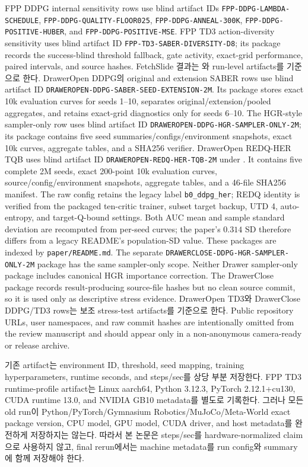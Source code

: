\documentclass[letterpaper]{article}
\begin{document}
FPP DDPG internal sensitivity rows use blind artifact IDs \texttt{FPP-DDPG-LAMBDA-SCHEDULE}, \texttt{FPP-DDPG-QUALITY-FLOOR025}, \texttt{FPP-DDPG-ANNEAL-300K}, \texttt{FPP-DDPG-POSITIVE-HUBER}, and \texttt{FPP-DDPG-POSITIVE-MSE}. FPP TD3 action-diversity sensitivity uses blind artifact ID \texttt{FPP-TD3-SABER-DIVERSITY-D8}; its package records the success-blind threshold fallback, gate activity, exact-grid performance, paired intervals, and source hashes. FetchSlide 결과는 와 run-level artifacts를 기준으로 한다. DrawerOpen DDPG의 original and extension SABER rows use blind artifact ID \texttt{DRAWEROPEN-DDPG-SABER-SEED-EXTENSION-2M}. Its package stores exact 10k evaluation curves for seeds 1--10, separates original/extension/pooled aggregates, and retains exact-grid diagnostics only for seeds 6--10. The HGR-style sampler-only row uses blind artifact ID \texttt{DRAWEROPEN-DDPG-HGR-SAMPLER-ONLY-2M}; its package contains five seed summaries/configs/environment snapshots, exact 10k curves, aggregate tables, and a SHA256 verifier. DrawerOpen REDQ-HER TQB uses blind artifact ID \texttt{DRAWEROPEN-REDQ-HER-TQB-2M} under . It contains five complete 2M seeds, exact 200-point 10k evaluation curves, source/config/environment snapshots, aggregate tables, and a 46-file SHA256 manifest. The raw config retains the legacy label \texttt{b0\_ddpg\_her}; REDQ identity is verified from the packaged ten-critic trainer, subset target backup, UTD 4, auto-entropy, and target-Q-bound settings. Both AUC mean and sample standard deviation are recomputed from per-seed curves; the paper's \(0.314\) SD therefore differs from a legacy README's population-SD value. These packages are indexed by \texttt{paper/README.md}. The separate \texttt{DRAWERCLOSE-DDPG-HGR-SAMPLER-ONLY-2M} package has the same sampler-only scope. Neither Drawer sampler-only package includes canonical HGR importance correction. The DrawerClose package records result-producing source-file hashes but no clean source commit, so it is used only as descriptive stress evidence. DrawerOpen TD3와 DrawerClose DDPG/TD3 rows는 보조 stress-test artifacts를 기준으로 한다. Public repository URLs, user namespaces, and raw commit hashes are intentionally omitted from the review manuscript and should appear only in a non-anonymous camera-ready or release archive.

기존 artifact는 environment ID, threshold, seed mapping, training hyperparameters, runtime seconds, and steps/sec를 상당 부분 저장한다. FPP TD3 runtime-profile artifact는 Linux aarch64, Python 3.12.3, PyTorch 2.12.1+cu130, CUDA runtime 13.0, and NVIDIA GB10 metadata를 별도로 기록한다. 그러나 모든 old run이 Python/PyTorch/Gymnasium Robotics/MuJoCo/Meta-World exact package version, CPU model, GPU model, CUDA driver, and host metadata를 완전하게 저장하지는 않는다. 따라서 본 논문은 steps/sec를 hardware-normalized claim으로 사용하지 않고, final rerun에서는 machine metadata를 run config와 summary에 함께 저장해야 한다.
\end{document}
